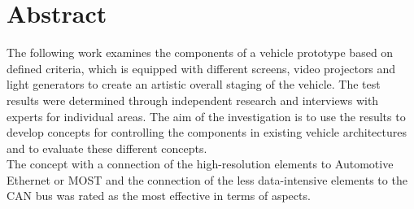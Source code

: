 \chapter*{Abstract} %
The following work examines the components of a vehicle prototype based on defined criteria, which is equipped with different screens, video projectors and light generators to create an artistic overall staging of the vehicle. The test results were determined through independent research and interviews with experts for individual areas. The aim of the investigation is to use the results to develop concepts for controlling the components in existing vehicle architectures and to evaluate these different concepts. \\
The concept with a connection of the high-resolution elements to Automotive Ethernet or MOST and the connection of the less data-intensive elements to the CAN bus was rated as the most effective in terms of aspects.


\cleardoublepage